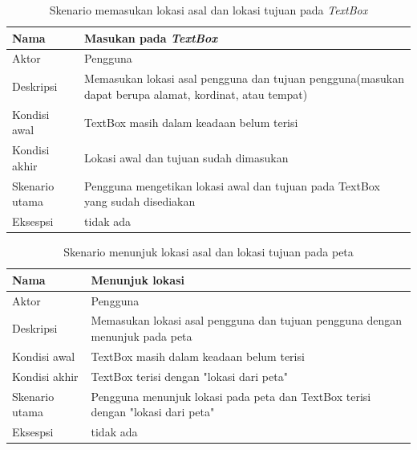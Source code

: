 \begin{table}[H]
	\centering
		\begin{tabular}{ |p{2cm}|p{10cm}| }
			\hline
			Nama &  Masukan pada \textit{TextBox}\\ \hline
			Aktor & Pengguna  \\ \hline
			Deskripsi & Memasukan lokasi asal pengguna dan tujuan pengguna(masukan dapat berupa alamat, kordinat, atau tempat) \\ \hline
			Kondisi awal & TextBox masih dalam keadaan belum terisi \\ \hline
			Kondisi akhir & Lokasi awal dan tujuan sudah dimasukan   \\ \hline
			Skenario utama & Pengguna mengetikan lokasi awal dan tujuan pada TextBox yang sudah disediakan \\ \hline
			Eksespsi & tidak ada  \\ 
			\hline
		\end{tabular}
	\caption{Skenario memasukan lokasi asal dan lokasi tujuan pada \textit{TextBox}}
	\label{tab:masukanLokasi}
\end{table}

\begin{table}[H]
	\centering
		\begin{tabular}{ |p{2cm}|p{10cm}| }
			\hline
			Nama &  Menunjuk lokasi\\ \hline
			Aktor & Pengguna  \\ \hline
			Deskripsi & Memasukan lokasi asal pengguna dan tujuan pengguna dengan menunjuk pada peta \\ \hline
			Kondisi awal & TextBox masih dalam keadaan belum terisi \\ \hline
			Kondisi akhir & TextBox terisi dengan "lokasi dari peta"   \\ \hline
			Skenario utama & Pengguna menunjuk lokasi pada peta dan TextBox terisi dengan "lokasi dari peta" \\ \hline
			Eksespsi & tidak ada  \\ 
			\hline
		\end{tabular}
	\caption{Skenario menunjuk lokasi asal dan lokasi tujuan pada peta}
	\label{tab:lokasiPeta}
\end{table}


